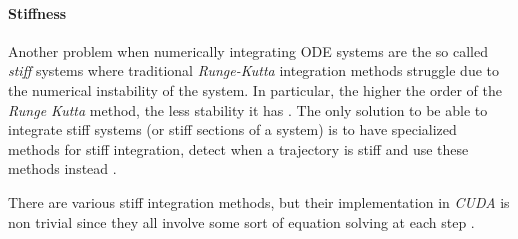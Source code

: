 \paragraph{Stiffness} %
\label{sub:stiffness}

Another problem when numerically integrating ODE systems are the so called
\emph{stiff} systems where traditional \emph{Runge-Kutta} integration methods
struggle due to the numerical instability of the system. In particular, the
higher the order of the \emph{Runge Kutta} method, the less stability it has
\cite{skvortsov_accuracy_2003}.
The only solution to be able to integrate stiff systems (or stiff sections of a
system) is to have specialized methods for stiff integration, detect when a
trajectory is stiff and use these methods instead
\cite{shampine_detecting_1977}.

There are various stiff integration methods, but their implementation in
\emph{CUDA} is non trivial since they all involve some sort of equation solving
at each step \cite{butcher_numerical_2008}.

